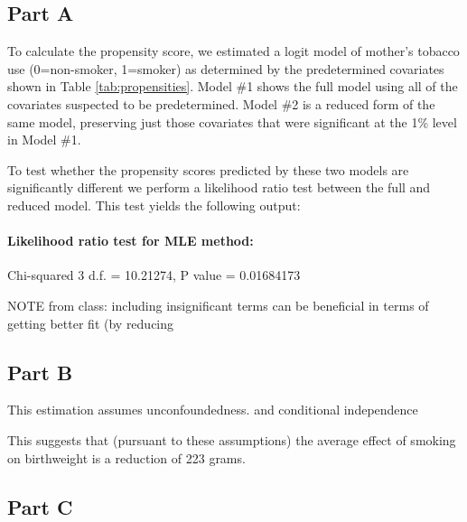 \documentclass[letterpaper, 12pt]{article}
\begin{document}
\subsection{Part A}

To calculate the propensity score, we estimated a logit model of mother's tobacco use (0=non-smoker, 1=smoker) as determined by the predetermined covariates shown in Table \ref{tab:propensities}. Model \#1 shows the full model using all of the covariates suspected to be predetermined. Model \#2 is a reduced form of the same model, preserving just those covariates that were significant at the 1\% level in Model \#1. 

\let\clearpage\relax
 

To test whether the propensity scores predicted by these two models are significantly different  we perform a likelihood ratio test between  the full and reduced model. This test yields the following output:

\paragraph{Likelihood ratio test for MLE method:} Chi-squared 3 d.f. =  10.21274, P value =  0.01684173 


NOTE from class: including insignificant terms can be beneficial in terms of getting better fit (by reducing 



\subsection{Part B}

This estimation assumes unconfoundedness. and conditional independence


%


This suggests that (pursuant to these assumptions) the average effect of smoking on birthweight is a reduction of 223 grams.

\subsection{Part C}
\end{document}
